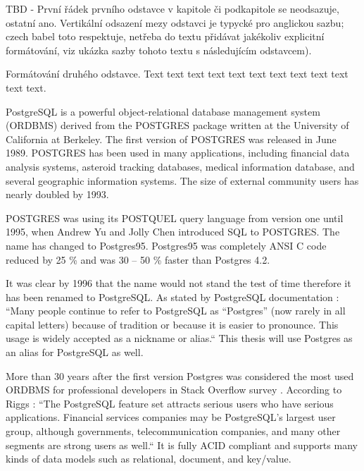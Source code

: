 
TBD - První řádek prvního odstavce v kapitole či podkapitole se neodsazuje, ostatní ano. Vertikální odsazení mezy odstavci je typycké pro anglickou sazbu; czech babel toto respektuje, netřeba do textu přidávat jakékoliv explicitní formátování, viz ukázka sazby tohoto textu s následujícím odstavcem).

Formátování druhého odstavce. Text text text text text text text text text text text text.



PostgreSQL is a powerful object-relational database management system (ORDBMS) derived from the POSTGRES package written at the University of California at Berkeley. The first version of POSTGRES was released in June 1989. POSTGRES has been used in many applications, including financial data analysis systems, asteroid tracking databases, medical information database, and several geographic information systems. The size of external community users has nearly doubled by 1993.\cite{the_postgresql_global_development_group_postgresql_2022}
    
 POSTGRES was using its POSTQUEL query language from version one until 1995, when Andrew Yu and Jolly Chen introduced SQL to POSTGRES. The name has changed to Postgres95. Postgres95 was completely ANSI C code reduced by 25 \% and was 30 – 50 \% faster than Postgres 4.2.  \cite{the_postgresql_global_development_group_postgresql_2022}

It was clear by 1996 that the name would not stand the test of time therefore it has been renamed to PostgreSQL. As stated by PostgreSQL documentation \cite{the_postgresql_global_development_group_postgresql_2022}: “Many people continue to refer to PostgreSQL as “Postgres” (now rarely in all capital letters) because of tradition or because it is easier to pronounce. This usage is widely accepted as a nickname or alias.“ This thesis will use Postgres as an alias for PostgreSQL as well. 
\cite{the_postgresql_global_development_group_postgresql_2022}

More than 30 years after the first version Postgres was considered the most used ORDBMS for professional developers in Stack Overflow survey \cite{so2022survey}. According to Riggs \cite{Riggs2022}: “The PostgreSQL feature set attracts serious users who have serious applications. Financial services companies may be PostgreSQL's largest user group, although governments, telecommunication companies, and many other segments are strong users as well.“ It is fully ACID compliant \cite{juba2015learning} and supports many kinds of data models such as relational, document, and key/value. \cite{Riggs2022}

